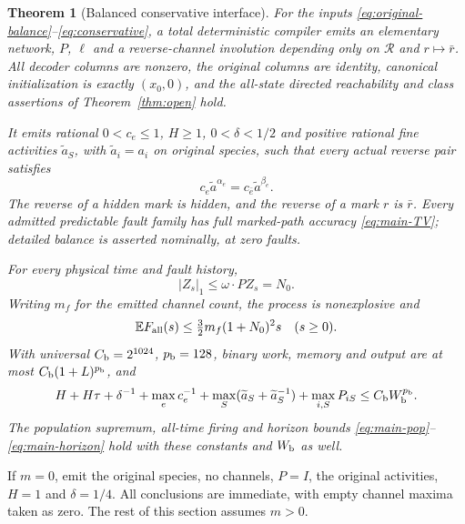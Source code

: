 \documentclass[11pt,reqno]{amsart}
\newtheorem{theorem}{Theorem}[section]
\theoremstyle{definition}
\theoremstyle{remark}
\newcommand{\E}{\mathbb E}
\begin{document}
\begin{theorem}[Balanced conservative interface]\label{thm:balanced}
For the inputs \eqref{eq:original-balance}--\eqref{eq:conservative}, a total
deterministic compiler emits an elementary network, $P$, $\ell$ and a
reverse-channel involution depending only on $\mathcal R$ and $r\mapsto\bar r$.
All decoder columns are nonzero, the original columns are identity, canonical
initialization is exactly $(x_0,0)$, and the all-state directed reachability
and class assertions of Theorem~\ref{thm:open} hold.

It emits rational $0<c_e\le1$, $H\ge1$, $0<\delta<1/2$ and positive rational
fine activities $\widetilde a_S$, with $\widetilde a_i=a_i$ on original
species, such that every actual reverse pair satisfies
\begin{equation}\label{eq:fine-balance}
 c_e\widetilde a^{\alpha_e}
   =c_{\bar e}\widetilde a^{\beta_e}.
\end{equation}
The reverse of a hidden mark is hidden, and the reverse of a mark $r$ is
$\bar r$. Every admitted predictable fault family has full marked-path
accuracy \eqref{eq:main-TV}; detailed balance is asserted nominally, at zero
faults.

For every physical time and fault history,
\begin{equation}\label{eq:balanced-pop-cap}
 |Z_s|_1\le\omega\cdot PZ_s=N_0.
\end{equation}
Writing $m_f$ for the emitted channel count, the process is nonexplosive and
\begin{equation}\label{eq:balanced-events}
 \E F_{\rm all}(s)\le\tfrac32m_f(1+N_0)^2s
 \quad(s\ge0).
\end{equation}
With universal $C_{\rm b}=2^{1024}$, $p_{\rm b}=128$, binary work, memory
and output are at most $C_{\rm b}(1+L)^{p_{\rm b}}$, and
\begin{equation}\label{eq:balanced-resources}
 H+H\tau+\delta^{-1}+\max_e c_e^{-1}
 +\max_S(\widetilde a_S+\widetilde a_S^{-1})
 +\max_{i,S}P_{iS}\le C_{\rm b}W_{\rm b}^{p_{\rm b}}.
\end{equation}
The population supremum, all-time firing and horizon bounds
\eqref{eq:main-pop}--\eqref{eq:main-horizon} hold with these constants and
$W_{\rm b}$ as well.
\end{theorem}

If $m=0$, emit the original species, no channels, $P=I$, the original
activities, $H=1$ and $\delta=1/4$. All conclusions are immediate, with empty
channel maxima taken as zero. The rest of this section assumes $m>0$.
\end{document}
